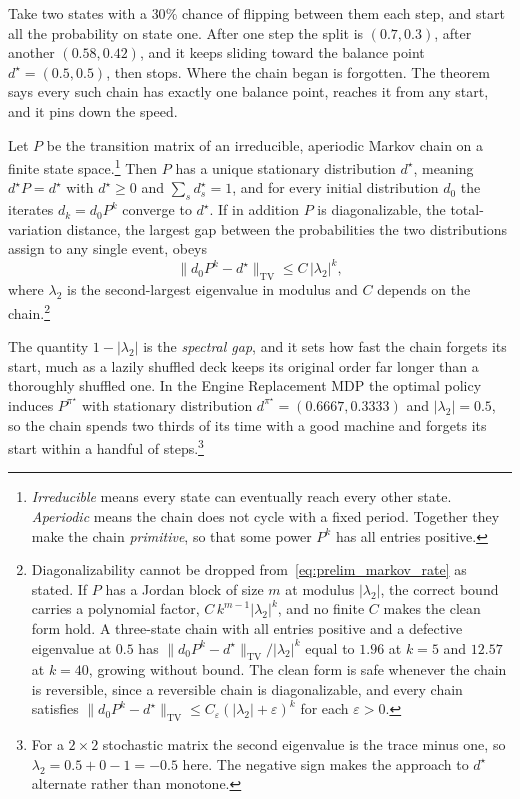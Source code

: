 Take two states with a $30\%$ chance of flipping between them each step, and start all the probability on state one. After one step the split is $(0.7, 0.3)$, after another $(0.58, 0.42)$, and it keeps sliding toward the balance point $d^\star = (0.5, 0.5)$, then stops. Where the chain began is forgotten. The theorem says every such chain has exactly one balance point, reaches it from any start, and it pins down the speed.

\begin{theorem}
\label{thm:prelim_markov}
Let $P$ be the transition matrix of an irreducible, aperiodic Markov chain on a finite state space.\footnote{\emph{Irreducible} means every state can eventually reach every other state. \emph{Aperiodic} means the chain does not cycle with a fixed period. Together they make the chain \emph{primitive}, so that some power $P^k$ has all entries positive.} Then $P$ has a unique stationary distribution $d^\star$, meaning $d^\star P = d^\star$ with $d^\star \geq 0$ and $\sum_s d^\star_s = 1$, and for every initial distribution $d_0$ the iterates $d_k = d_0 P^k$ converge to $d^\star$. If in addition $P$ is diagonalizable, the total-variation distance, the largest gap between the probabilities the two distributions assign to any single event, obeys
\begin{equation}
\| d_0 P^k - d^\star \|_{\mathrm{TV}} \leq C\, |\lambda_2|^k,
\label{eq:prelim_markov_rate}
\end{equation}
where $\lambda_2$ is the second-largest eigenvalue in modulus and $C$ depends on the chain.\footnote{Diagonalizability cannot be dropped from~\eqref{eq:prelim_markov_rate} as stated. If $P$ has a Jordan block of size $m$ at modulus $|\lambda_2|$, the correct bound carries a polynomial factor, $C\,k^{m-1}|\lambda_2|^k$, and no finite $C$ makes the clean form hold. A three-state chain with all entries positive and a defective eigenvalue at $0.5$ has $\|d_0P^k - d^\star\|_{\mathrm{TV}} / |\lambda_2|^k$ equal to $1.96$ at $k=5$ and $12.57$ at $k=40$, growing without bound. The clean form is safe whenever the chain is reversible, since a reversible chain is diagonalizable, and every chain satisfies $\|d_0P^k - d^\star\|_{\mathrm{TV}} \leq C_\varepsilon(|\lambda_2| + \varepsilon)^k$ for each $\varepsilon > 0$.}
\end{theorem}

The quantity $1 - |\lambda_2|$ is the \emph{spectral gap}, and it sets how fast the chain forgets its start, much as a lazily shuffled deck keeps its original order far longer than a thoroughly shuffled one. In the Engine Replacement MDP the optimal policy induces $P^{\pi^\star}$ with stationary distribution $d^{\pi^\star} = (0.6667, 0.3333)$ and $|\lambda_2| = 0.5$, so the chain spends two thirds of its time with a good machine and forgets its start within a handful of steps.\footnote{For a $2 \times 2$ stochastic matrix the second eigenvalue is the trace minus one, so $\lambda_2 = 0.5 + 0 - 1 = -0.5$ here. The negative sign makes the approach to $d^\star$ alternate rather than monotone.}

